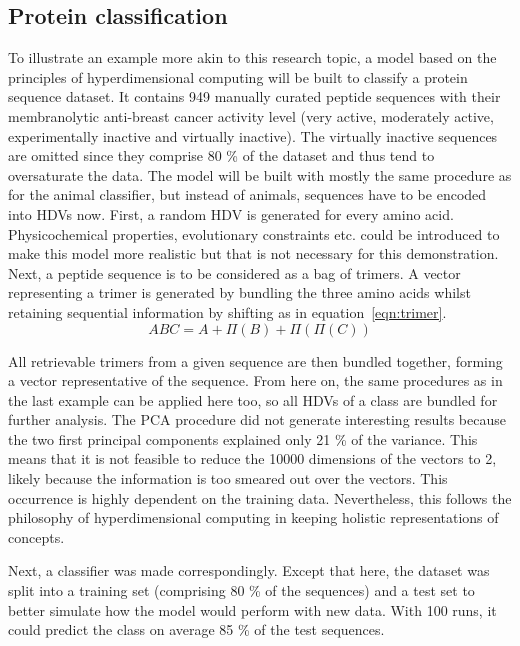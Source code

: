 \subsection{Protein classification}
To illustrate an example more akin to this research topic, a model based on the principles of hyperdimensional computing will be built to classify a protein sequence dataset\cite{anticancer}. It contains 949 manually curated peptide sequences with their membranolytic anti-breast cancer activity level (very active, moderately active, experimentally inactive and virtually inactive). The virtually inactive sequences are omitted since they comprise 80 \% of the dataset and thus tend to oversaturate the data. The model will be built with mostly the same procedure as for the animal classifier, but instead of animals, sequences have to be encoded into HDVs now. First, a random HDV is generated for every amino acid. Physicochemical properties, evolutionary constraints etc. could be introduced to make this model more realistic but that is not necessary for this demonstration. Next, a peptide sequence is to be considered as a bag of trimers. A vector representing a trimer is generated by bundling the three amino acids whilst retaining sequential information by shifting as in equation~\ref{eqn:trimer}.
\begin{equation}\label{eqn:trimer}
    ABC = A + \Pi (B) + \Pi (\Pi (C))
\end{equation}

All retrievable trimers from a given sequence are then bundled together, forming a vector representative of the sequence. From here on, the same procedures as in the last example can be applied here too, so all HDVs of a class are bundled for further analysis. The PCA procedure did not generate interesting results because the two first principal components explained only 21 \% of the variance. This means that it is not feasible to reduce the 10000 dimensions of the vectors to 2, likely because the information is too smeared out over the vectors. This occurrence is highly dependent on the training data. Nevertheless, this follows the philosophy of hyperdimensional computing in keeping holistic representations of concepts.

Next, a classifier was made correspondingly. Except that here, the dataset was split into a training set (comprising 80 \% of the sequences) and a test set to better simulate how the model would perform with new data. With 100 runs, it could predict the class on average 85 \% of the test sequences.
